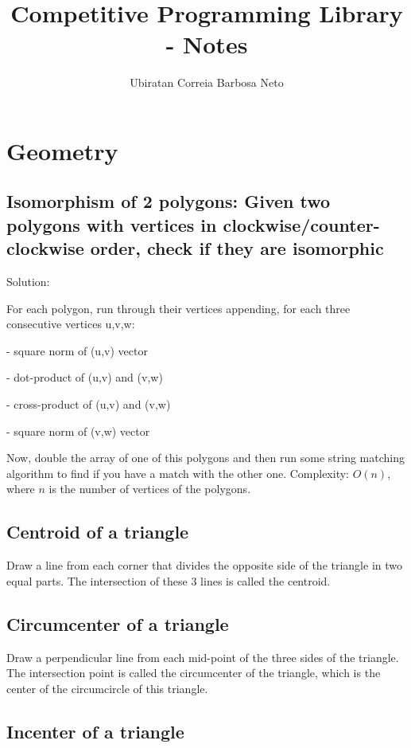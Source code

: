 \documentclass[12pt]{article}%
\begin{document}
\title{Competitive Programming Library - Notes}
\author{Ubiratan Correia Barbosa Neto}
\maketitle

\section{Geometry}

\subsection{Isomorphism of 2 polygons: Given two polygons with vertices in clockwise/counter-clockwise order, check if they are isomorphic}

Solution:

For each polygon, run through their vertices appending, for each three consecutive vertices u,v,w:

- square norm of (u,v) vector

- dot-product of (u,v) and (v,w)

- cross-product of (u,v) and (v,w)

- square norm of (v,w) vector

Now, double the array of one of this polygons and then run some string matching algorithm to find if you have a match with the other one. Complexity: $O(n)$, where $n$ is the number of vertices of the polygons. 

\subsection{Centroid of a triangle}

Draw a line from each corner that divides the opposite side of the triangle in two equal parts. The intersection of these 3 lines is called the centroid.

\subsection{Circumcenter of a triangle}

Draw a perpendicular line from each mid-point of the three sides of the triangle. The intersection point is called the circumcenter of the triangle, which is the center of the circumcircle of this triangle.

\subsection{Incenter of a triangle}
\end{document}
